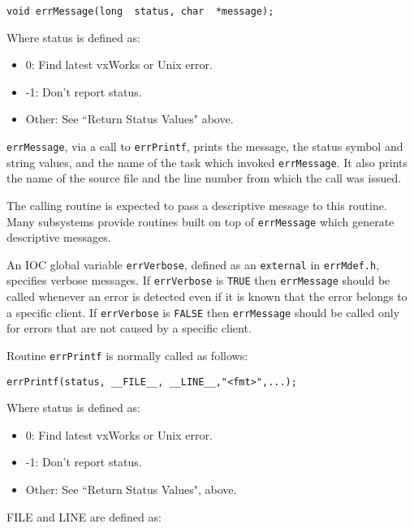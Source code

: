 \begin{verbatim}void errMessage(long  status, char  *message);
\end{verbatim}Where status is defined as:

\begin{itemize}\item 0:  Find latest vxWorks or Unix error.

\item -1:  Don't report status.

\item Other:  See ``Return Status Values" above.

\end{itemize}\verb|errMessage|, via a call to \verb|errPrintf|, prints the message, the status symbol and string values, and the name of the task 
which invoked \verb|errMessage|. It also prints the name of the source file and the line number from which the call was 
issued.

The calling routine is expected to pass a descriptive message to this routine. Many subsystems provide routines built on 
top of \verb|errMessage| which generate descriptive messages. 

An IOC global variable \verb|errVerbose|, defined as an \verb|external| in \verb|errMdef.h|, specifies verbose messages. If 
\verb|errVerbose| is \verb|TRUE| then \verb|errMessage| should be called whenever an error is detected even if it is known that the 
error belongs to a specific client. If \verb|errVerbose| is \verb|FALSE| then \verb|errMessage| should be called only for errors that are 
not caused by a specific client.

Routine \verb|errPrintf| is normally called as follows:

\begin{verbatim}errPrintf(status, __FILE__, __LINE__,"<fmt>",...);
\end{verbatim}Where status is defined as:

\begin{itemize}\item 0:  Find latest vxWorks or Unix error.

\item -1:  Don't report status.

\item Other:  See ``Return Status Values", above.

\end{itemize}FILE and LINE are defined as:

